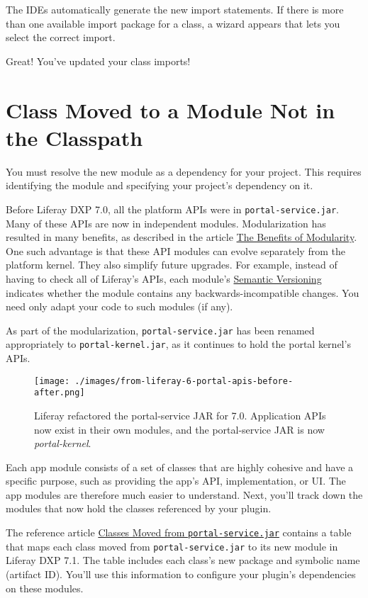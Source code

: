 The IDEs automatically generate the new import statements. If there is
more than one available import package for a class, a wizard appears
that lets you select the correct import.

Great! You've updated your class imports!

\section{Class Moved to a Module Not in the
Classpath}\label{class-moved-to-a-module-not-in-the-classpath}

You must resolve the new module as a dependency for your project. This
requires identifying the module and specifying your project's dependency
on it.

Before Liferay DXP 7.0, all the platform APIs were in
\texttt{portal-service.jar}. Many of these APIs are now in independent
modules. Modularization has resulted in many benefits, as described in
the article
\href{/docs/7-2/customization/-/knowledge_base/c/the-benefits-of-modularity}{The
Benefits of Modularity}. One such advantage is that these API modules
can evolve separately from the platform kernel. They also simplify
future upgrades. For example, instead of having to check all of
Liferay's APIs, each module's \href{http://semver.org}{Semantic
Versioning} indicates whether the module contains any
backwards-incompatible changes. You need only adapt your code to such
modules (if any).

As part of the modularization, \texttt{portal-service.jar} has been
renamed appropriately to \texttt{portal-kernel.jar}, as it continues to
hold the portal kernel's APIs.

\begin{figure}
\centering
\texttt{[image: ./images/from-liferay-6-portal-apis-before-after.png]}
\caption{Liferay refactored the portal-service JAR for 7.0. Application
APIs now exist in their own modules, and the portal-service JAR is now
\emph{portal-kernel}.}
\end{figure}

Each app module consists of a set of classes that are highly cohesive
and have a specific purpose, such as providing the app's API,
implementation, or UI. The app modules are therefore much easier to
understand. Next, you'll track down the modules that now hold the
classes referenced by your plugin.

The reference article
\href{/docs/7-2/reference/-/knowledge_base/r/classes-moved-from-portal-service-jar}{Classes
Moved from \texttt{portal-service.jar}} contains a table that maps each
class moved from \texttt{portal-service.jar} to its new module in
Liferay DXP 7.1. The table includes each class's new package and
symbolic name (artifact ID). You'll use this information to configure
your plugin's dependencies on these modules.

